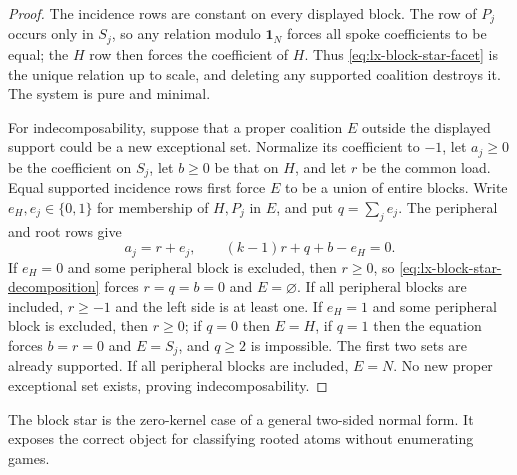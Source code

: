 \begin{proof}
The incidence rows are constant on every displayed block.  The row of
$P_j$ occurs only in $S_j$, so any relation modulo $\mathbf1_N$ forces all
spoke coefficients to be equal; the $H$ row then forces the coefficient of
$H$.  Thus \eqref{eq:lx-block-star-facet} is the unique relation up to scale,
and deleting any supported coalition destroys it.  The system is pure and
minimal.

For indecomposability, suppose that a proper coalition $E$ outside the
displayed support could be a new exceptional set.  Normalize its coefficient
to $-1$, let $a_j\geq0$ be the coefficient on $S_j$, let $b\geq0$ be that on
$H$, and let $r$ be the common load.  Equal supported incidence rows first
force $E$ to be a union of entire blocks.  Write $e_H,e_j\in\{0,1\}$ for
membership of $H,P_j$ in $E$, and put $q=\sum_j e_j$.  The peripheral and
root rows give
\[
 a_j=r+e_j,\qquad (k-1)r+q+b-e_H=0.                \tag{BSD}
 \label{eq:lx-block-star-decomposition}
\]
If $e_H=0$ and some peripheral block is excluded, then $r\geq0$, so
\eqref{eq:lx-block-star-decomposition} forces $r=q=b=0$ and $E=\varnothing$.
If all peripheral blocks are included, $r\geq-1$ and the left side is at
least one.  If $e_H=1$ and some peripheral block is excluded, then $r\geq0$;
if $q=0$ then $E=H$, if $q=1$ then the equation forces $b=r=0$ and
$E=S_j$, and $q\geq2$ is impossible.  The first two sets are already
supported.  If all peripheral blocks are included, $E=N$.  No new proper
exceptional set exists, proving indecomposability.
\end{proof}

The block star is the zero-kernel case of a general two-sided normal form.
It exposes the correct object for classifying rooted atoms without enumerating
games.

